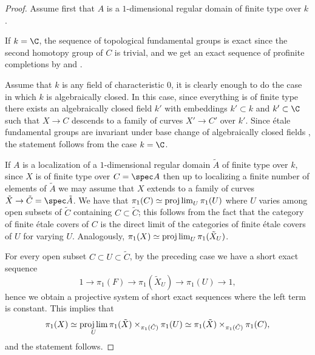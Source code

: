 \begin{proof}
    Assume first that $A$ is a $1$-dimensional regular domain of finite type over $k$.

    If $k=\C$, the sequence of topological fundamental groups is exact since the second homotopy group of $C$ is trivial, and we get an exact sequence of profinite completions by \cite[Proposition 5]{anderson} and \cite[Proposition 3.7]{gjz08}.

    Assume that $k$ is any field of characteristic $0$, it is clearly enough to do the case in which $k$ is algebraically closed. In this case, since everything is of finite type there exists an algebraically closed field $k'$ with embeddings $k'\subset k$ and $k'\subset \C$ such that $X\to C$ descends to a family of curves $X'\to C'$ over $k'$. Since étale fundamental groups are invariant under base change of algebraically closed fields \cite[Exposé X, Corollaire 1.8]{sga1}, the statement follows from the case $k=\C$.

    If $A$ is a localization of a $1$-dimensional regular domain $\tilde{A}$ of finite type over $k$, since $X$ is of finite type over $C=\spec A$ then up to localizing a finite number of elements of $\tilde{A}$ we may assume that $X$ extends to a family of curves $\tilde{X}\to\tilde{C}=\spec\tilde{A}$. We have that $\pi_{1}(C)\simeq\projlim_{U}\pi_{1}(U)$ where $U$ varies among open subsets of $\tilde{C}$ containing $C\subset \tilde{C}$; this follows from the fact that the category of finite étale covers of $C$ is the direct limit of the categories of finite étale covers of $U$ for varying $U$. Analogously, $\pi_{1}(X)\simeq\projlim_{U}\pi_{1}(\tilde{X}_{U})$.

    For every open subset $C\subset U\subset \tilde{C}$, by the preceding case we have a short exact sequence
    \[1\to\pi_{1}(F)\to\pi_{1}(\tilde{X}_{U})\to\pi_{1}(U)\to 1,\]
    hence we obtain a projective system of short exact sequences where the left term is constant. This implies that
    \[\pi_{1}(X)\simeq\projlim_{U}\pi_{1}(\tilde{X})\times_{\pi_{1}(\tilde{C})}\pi_{1}(U)\simeq \pi_{1}(\tilde{X})\times_{\pi_{1}(\tilde{C})}\pi_{1}(C),\]
    and the statement follows.




\end{proof}
